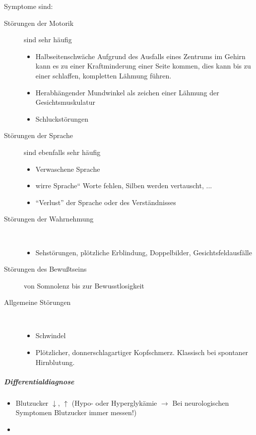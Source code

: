  Symptome sind:

\begin{description}
    \item[Störungen der Motorik] sind sehr häufig
    \begin{itemize}
        \item Halbseitenschwäche Aufgrund des Ausfalls eines Zentrums im Gehirn kann es zu einer Kraftminderung einer Seite kommen, dies kann bis zu einer schlaffen, kompletten Lähmung führen.
        \item Herabhängender Mundwinkel als zeichen einer Lähmung der Gesichtsmuskulatur
        \item Schluckstörungen
    \end{itemize}
    \item[Störungen der Sprache] sind ebenfalls sehr häufig
    \begin{itemize}
        \item Verwaschene Sprache
        \item {\quotedblbase}wirre Sprache{\textquotedblleft} Worte fehlen, Silben
        werden vertauscht, ...
        \item "`Verlust"' der Sprache oder des
        Verständnisses
        
    \end{itemize}
    \item[Störungen der Wahrnehmung] ~
    \begin{itemize}
        \item Sehstörungen, plötzliche Erblindung, Doppelbilder,
        Gesichtsfeldausfälle
    \end{itemize}
    \item[Störungen des Bewußtseins] von Somnolenz bis zur Bewusstlosigkeit
    
    \item[Allgemeine Störungen] ~
    \begin{itemize}
        \item Schwindel
        \item Plötzlicher, donnerschlagartiger Kopfschmerz. Klassisch bei spontaner Hirnblutung.
    \end{itemize}
\end{description}

\subparagraph*{
Differentialdiagnose}

\begin{itemize}
\item Blutzucker ${\downarrow}$, ${\uparrow}$
(Hypo- oder Hyperglykämie ${\rightarrow}$ Bei neurologischen
Symptomen Blutzucker immer messen!)
\item {}
\end{itemize}


